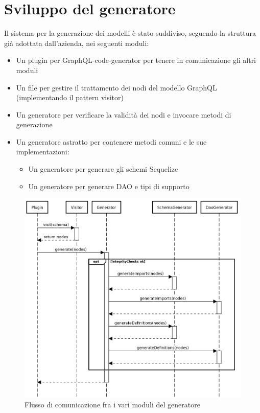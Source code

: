 \documentclass[a4paper, 12pt]{report}
\begin{document}
    \chapter{Sviluppo del generatore}
      Il sistema per la generazione dei modelli è stato suddiviso, seguendo la struttura già adottata dall'azienda, nei seguenti moduli:
      \begin{itemize}
        \item Un plugin per GraphQL-code-generator per tenere in comunicazione gli altri moduli
        \item Un file per gestire il trattamento dei nodi del modello GraphQL (implementando il pattern visitor)
        \item Un generatore per verificare la validità dei nodi e invocare metodi di generazione
        \item Un generatore astratto per contenere metodi comuni e le sue implementazioni:
        \begin{itemize}
          \item Un generatore per generare gli schemi Sequelize
          \item Un generatore per generare DAO e tipi di supporto
        \end{itemize}
      \end{itemize}
      \begin{figure}[H]
        \includegraphics[width=\textwidth]{generator_workflow.png}
        \caption{Flusso di comunicazione fra i vari moduli del generatore}
      \end{figure}
\end{document}
